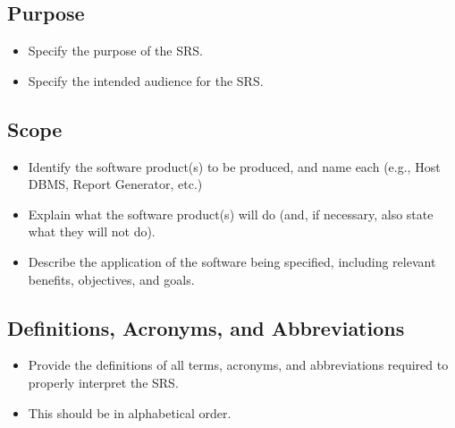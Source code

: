 \documentclass[]{article}
\begin{document}
\subsection{Purpose}
\label{sub:purpose}
\begin{itemize}
	\item Specify the purpose of the SRS.
	\item Specify the intended audience for the SRS.
\end{itemize}

\subsection{Scope}
\label{sub:scope}
\begin{itemize}
	\item Identify the software product(s) to be produced, and name each (e.g., Host DBMS, Report Generator, etc.)
	\item Explain what the software product(s) will do (and, if necessary, also state what they will not do).
	\item Describe the application of the software being specified, including relevant benefits, objectives, and goals.
\end{itemize}

\subsection{Definitions, Acronyms, and Abbreviations}
\label{sub:definitions_acronyms_and_abbreviations}
\begin{itemize}
	\item Provide the definitions of all terms, acronyms, and abbreviations required to properly interpret the SRS.
	\item This should be in alphabetical order.
\end{itemize}
\end{document}
